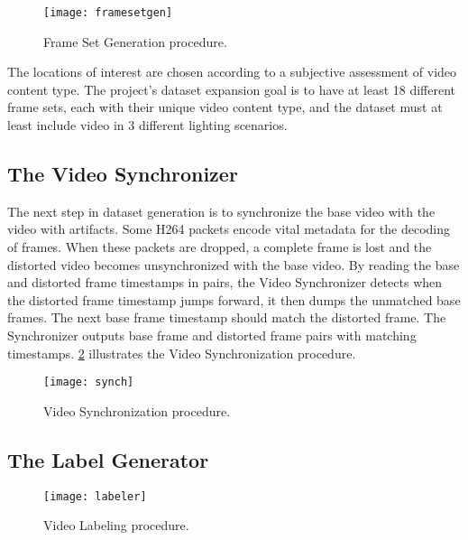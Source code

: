 \begin{figure} [!h]
  \centering
  
  \texttt{[image: framesetgen]}
  
  \caption{Frame Set Generation procedure.}
  \label{fig:framesetgen}

\end{figure}

The locations of interest are chosen according to a subjective assessment of video content type. The project's dataset expansion goal is to have at least 18 different frame sets, each with their unique video content type, and the dataset must at least include video in 3 different lighting scenarios.

\subsection{The Video Synchronizer}
\label{sec:sol_synch}

The next step in dataset generation is to synchronize the base video with the video with artifacts. Some H264 packets encode vital metadata for the decoding of frames. When these packets are dropped, a complete frame is lost and the distorted video becomes unsynchronized with the base video. By reading the base and distorted frame timestamps in pairs, the Video Synchronizer detects when the distorted frame timestamp jumps forward, it then dumps the unmatched base frames. The next base frame timestamp should match the distorted frame. The Synchronizer outputs base frame and distorted frame pairs with matching timestamps. \ref{fig:synch} illustrates the Video Synchronization procedure.

\begin{figure} [!h]
  \centering
  
  \texttt{[image: synch]}
  
  \caption{Video Synchronization procedure.}
  \label{fig:synch}

\end{figure}

\subsection{The Label Generator}
\label{sec:sol_labeler}

\begin{figure} [!h]
  \centering
  
  \texttt{[image: labeler]}
  
  \caption{Video Labeling procedure.}
  \label{fig:labeler}

\end{figure}

